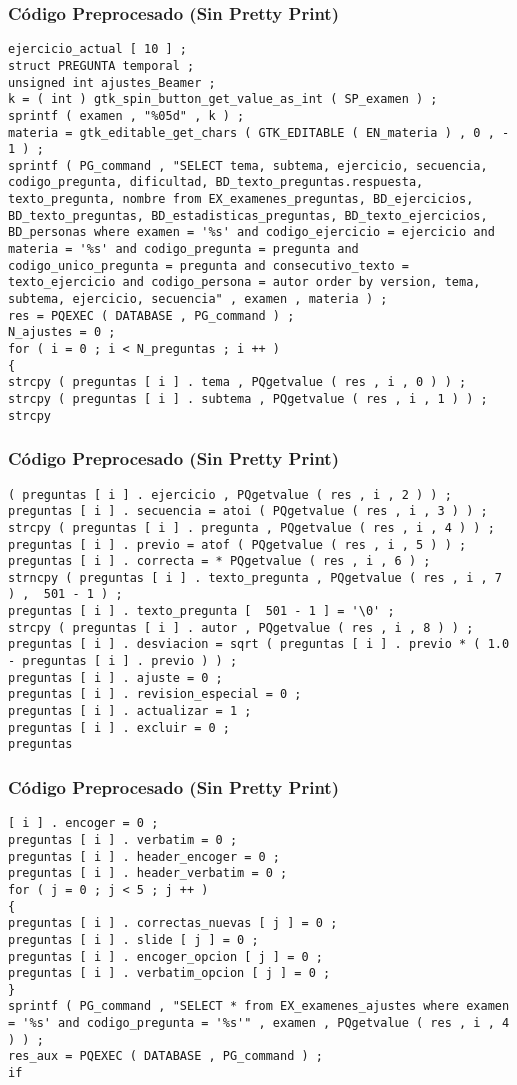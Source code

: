 \documentclass{beamer}
\begin{document}
\begin{frame}[fragile]
\frametitle{C\'odigo Preprocesado (Sin Pretty Print)}
\begin{lstlisting}[style=CStyle]
ejercicio_actual [ 10 ] ; 
struct PREGUNTA temporal ; 
unsigned int ajustes_Beamer ; 
k = ( int ) gtk_spin_button_get_value_as_int ( SP_examen ) ; 
sprintf ( examen , "%05d" , k ) ; 
materia = gtk_editable_get_chars ( GTK_EDITABLE ( EN_materia ) , 0 , - 1 ) ; 
sprintf ( PG_command , "SELECT tema, subtema, ejercicio, secuencia, codigo_pregunta, dificultad, BD_texto_preguntas.respuesta, texto_pregunta, nombre from EX_examenes_preguntas, BD_ejercicios, BD_texto_preguntas, BD_estadisticas_preguntas, BD_texto_ejercicios, BD_personas where examen = '%s' and codigo_ejercicio = ejercicio and materia = '%s' and codigo_pregunta = pregunta and codigo_unico_pregunta = pregunta and consecutivo_texto = texto_ejercicio and codigo_persona = autor order by version, tema, subtema, ejercicio, secuencia" , examen , materia ) ; 
res = PQEXEC ( DATABASE , PG_command ) ; 
N_ajustes = 0 ; 
for ( i = 0 ; i < N_preguntas ; i ++ ) 
{ 
strcpy ( preguntas [ i ] . tema , PQgetvalue ( res , i , 0 ) ) ; 
strcpy ( preguntas [ i ] . subtema , PQgetvalue ( res , i , 1 ) ) ; 
strcpy \end{lstlisting}
\end{frame}
\begin{frame}[fragile]
\frametitle{C\'odigo Preprocesado (Sin Pretty Print)}
\begin{lstlisting}[style=CStyle]
( preguntas [ i ] . ejercicio , PQgetvalue ( res , i , 2 ) ) ; 
preguntas [ i ] . secuencia = atoi ( PQgetvalue ( res , i , 3 ) ) ; 
strcpy ( preguntas [ i ] . pregunta , PQgetvalue ( res , i , 4 ) ) ; 
preguntas [ i ] . previo = atof ( PQgetvalue ( res , i , 5 ) ) ; 
preguntas [ i ] . correcta = * PQgetvalue ( res , i , 6 ) ; 
strncpy ( preguntas [ i ] . texto_pregunta , PQgetvalue ( res , i , 7 ) ,  501 - 1 ) ; 
preguntas [ i ] . texto_pregunta [  501 - 1 ] = '\0' ; 
strcpy ( preguntas [ i ] . autor , PQgetvalue ( res , i , 8 ) ) ; 
preguntas [ i ] . desviacion = sqrt ( preguntas [ i ] . previo * ( 1.0 - preguntas [ i ] . previo ) ) ; 
preguntas [ i ] . ajuste = 0 ; 
preguntas [ i ] . revision_especial = 0 ; 
preguntas [ i ] . actualizar = 1 ; 
preguntas [ i ] . excluir = 0 ; 
preguntas \end{lstlisting}
\end{frame}
\begin{frame}[fragile]
\frametitle{C\'odigo Preprocesado (Sin Pretty Print)}
\begin{lstlisting}[style=CStyle]
[ i ] . encoger = 0 ; 
preguntas [ i ] . verbatim = 0 ; 
preguntas [ i ] . header_encoger = 0 ; 
preguntas [ i ] . header_verbatim = 0 ; 
for ( j = 0 ; j < 5 ; j ++ ) 
{ 
preguntas [ i ] . correctas_nuevas [ j ] = 0 ; 
preguntas [ i ] . slide [ j ] = 0 ; 
preguntas [ i ] . encoger_opcion [ j ] = 0 ; 
preguntas [ i ] . verbatim_opcion [ j ] = 0 ; 
} 
sprintf ( PG_command , "SELECT * from EX_examenes_ajustes where examen = '%s' and codigo_pregunta = '%s'" , examen , PQgetvalue ( res , i , 4 ) ) ; 
res_aux = PQEXEC ( DATABASE , PG_command ) ; 
if \end{lstlisting}
\end{frame}
\end{document}
